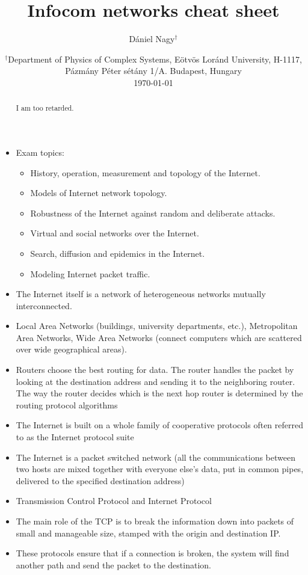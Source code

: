 \documentclass[11pt, a4paper]{article}
\title{Infocom networks cheat sheet}
\author{Dániel Nagy$^\dagger$}
\date{%
    $^\dagger$Department of Physics of Complex Systems, Eötvös Loránd University, H-1117, Pázmány Péter sétány 1/A. Budapest, Hungary\\[2ex]%
    \today
}
\begin{document}
\maketitle
\begin{abstract}
    I am too retarded.
\end{abstract}
\newpage
\begin{itemize}
    \item Exam topics:
    \begin{itemize}
        \item History, operation, measurement and topology of the Internet.
        \item Models of Internet network topology.
        \item Robustness of the Internet against random and deliberate attacks.
        \item Virtual and social networks over the Internet.
        \item Search, diffusion and epidemics in the Internet.
        \item Modeling Internet packet traffic.
    \end{itemize}
    \item The Internet itself is a network of heterogeneous networks mutually interconnected.
    \item Local Area Networks (buildings, university departments, etc.), Metropolitan Area Networks, Wide Area Networks (connect computers which are scattered over wide geographical areas).
    \item Routers choose the best routing for data. The router handles the packet by looking at the destination address and sending it to the neighboring router. The way the router decides which is the next hop router is determined by the routing protocol algorithms
    \item The Internet is built on a whole family of cooperative protocols often referred to as the Internet protocol suite
    \item The Internet is a packet switched network (all the communications between two hosts are mixed together with everyone else’s data, put in common pipes, delivered to the specified destination address)
    \item Transmission Control Protocol and Internet Protocol
    \item The main role of the TCP is to break the information down into packets of small and manageable size, stamped with the origin and destination IP.
    \item These protocols ensure that if a connection is broken, the system will find another path and send the packet to the destination.

\end{itemize}
\end{document}
